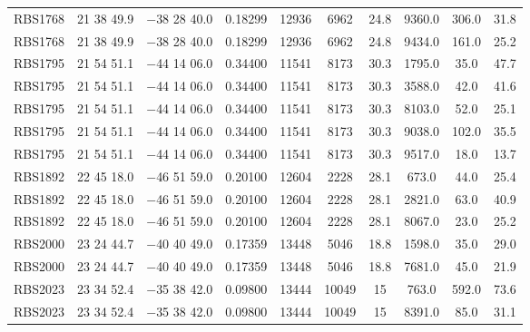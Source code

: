 \begin{landscape}
\begin{center}
\begin{longtable}{l c c c c c c c c c}
RBS1768  &                 21 38 49.9  &         $-$38 28 40.0  &       0.18299  & 12936  &   6962  &       24.8  &      9360.0  &  306.0  &  31.8  \\
RBS1768  &                 21 38 49.9  &         $-$38 28 40.0  &       0.18299  & 12936  &   6962  &       24.8  &      9434.0  &  161.0  &  25.2  \\
RBS1795  &                 21 54 51.1  &         $-$44 14 06.0  &       0.34400  & 11541  &   8173  &       30.3  &      1795.0  &  35.0  &   47.7  \\
RBS1795  &                 21 54 51.1  &         $-$44 14 06.0  &       0.34400  & 11541  &   8173  &       30.3  &      3588.0  &  42.0  &   41.6  \\
RBS1795  &                 21 54 51.1  &         $-$44 14 06.0  &       0.34400  & 11541  &   8173  &       30.3  &      8103.0  &  52.0  &   25.1  \\
RBS1795  &                 21 54 51.1  &         $-$44 14 06.0  &       0.34400  & 11541  &   8173  &       30.3  &      9038.0  &  102.0  &  35.5  \\
RBS1795  &                 21 54 51.1  &         $-$44 14 06.0  &       0.34400  & 11541  &   8173  &       30.3  &      9517.0  &  18.0  &   13.7  \\
RBS1892  &                 22 45 18.0  &         $-$46 51 59.0  &       0.20100  & 12604  &   2228  &       28.1  &      673.0  &   44.0  &   25.4  \\
RBS1892  &                 22 45 18.0  &         $-$46 51 59.0  &       0.20100  & 12604  &   2228  &       28.1  &      2821.0  &  63.0  &   40.9  \\
RBS1892  &                 22 45 18.0  &         $-$46 51 59.0  &       0.20100  & 12604  &   2228  &       28.1  &      8067.0  &  23.0  &   25.2  \\
RBS2000  &                 23 24 44.7  &         $-$40 40 49.0  &       0.17359  & 13448  &   5046  &       18.8  &      1598.0  &  35.0  &   29.0  \\
RBS2000  &                 23 24 44.7  &         $-$40 40 49.0  &       0.17359  & 13448  &   5046  &       18.8  &      7681.0  &  45.0  &   21.9  \\
RBS2023  &                 23 34 52.4  &         $-$35 38 42.0  &       0.09800  & 13444  &   10049  &      15  &        763.0  &   592.0  &  73.6  \\
RBS2023  &                 23 34 52.4  &         $-$35 38 42.0  &       0.09800  & 13444  &   10049  &      15  &        8391.0  &  85.0  &   31.1  \\

\end{longtable}
\end{center}
\end{landscape}
